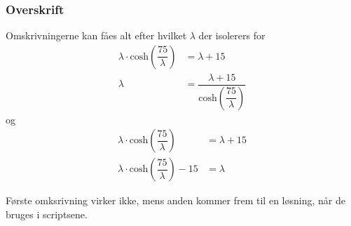 \begin{frame}
\frametitle{Overskrift}
\center
Omskrivningerne kan fåes alt efter hvilket $\lambda$ der isolerers for
%
\begin{align*}
\lambda \cdot \text{cosh}(\dfrac{75}{\lambda})&=\lambda+15\\
\lambda&=\dfrac{\lambda+15}{\text{cosh}(\dfrac{75}{\lambda})}
\end{align*}
 og
\begin{align*}
\lambda \cdot \text{cosh}(\dfrac{75}{\lambda})&=\lambda+15\\
\lambda \cdot \text{cosh}(\dfrac{75}{\lambda})-15 &=\lambda
\end{align*}

Første omksrivning virker ikke, mens anden kommer frem til en løsning, når de bruges i scriptsene.
\end{frame}